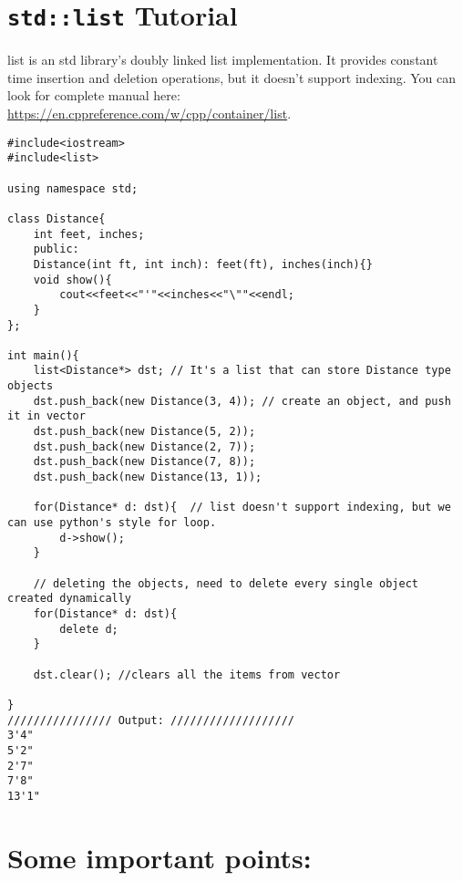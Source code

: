 \documentclass[a4paper,12pt]{article}
\begin{document}
\pagebreak

\section{\texttt{std::list} Tutorial} \label{vectorTutorial}

list is an std library's doubly linked list implementation. It provides constant time insertion and deletion operations, but it doesn't support indexing. You can look for complete manual here: \url{https://en.cppreference.com/w/cpp/container/list}.

\begin{lstlisting}
#include<iostream>
#include<list>

using namespace std;

class Distance{
	int feet, inches;
	public:
	Distance(int ft, int inch): feet(ft), inches(inch){}
	void show(){
		cout<<feet<<"'"<<inches<<"\""<<endl;
	}
};

int main(){
	list<Distance*> dst; // It's a list that can store Distance type objects
	dst.push_back(new Distance(3, 4)); // create an object, and push it in vector
	dst.push_back(new Distance(5, 2));
	dst.push_back(new Distance(2, 7));
	dst.push_back(new Distance(7, 8));
	dst.push_back(new Distance(13, 1));
	
	for(Distance* d: dst){	// list doesn't support indexing, but we can use python's style for loop.
		d->show(); 			
	}
	
	// deleting the objects, need to delete every single object created dynamically
	for(Distance* d: dst){
		delete d;
	}
	
	dst.clear(); //clears all the items from vector
	
}
//////////////// Output: ///////////////////
3'4"
5'2"
2'7"
7'8"
13'1"
\end{lstlisting}


\section{Some important points:} 
\end{document}
